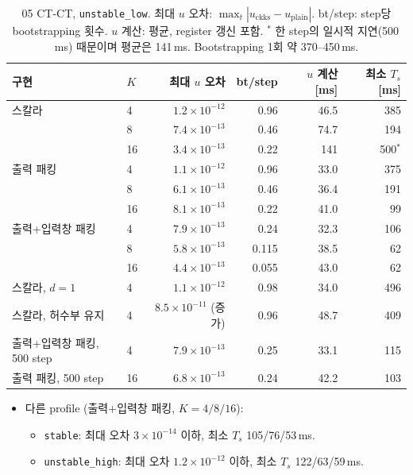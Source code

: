 \documentclass[11pt,a4paper]{article}
\begin{document}
\begin{table}[H]
\centering
\small
\begin{tabular}{llrrrr}
\toprule
구현 & $K$ & 최대 $u$ 오차 & bt/step & $u$ 계산 [ms] & 최소 $T_s$ [ms] \\
\midrule
스칼라 & 4 & $1.2\times10^{-12}$ & 0.96 & 46.5 & 385 \\
       & 8 & $7.4\times10^{-13}$ & 0.46 & 74.7 & 194 \\
       & 16 & $3.4\times10^{-13}$ & 0.22 & 141 & 500$^\ast$ \\
출력 패킹 & 4 & $1.1\times10^{-12}$ & 0.96 & 33.0 & 375 \\
          & 8 & $6.1\times10^{-13}$ & 0.46 & 36.4 & 191 \\
          & 16 & $8.1\times10^{-13}$ & 0.22 & 41.0 & 99 \\
출력+입력창 패킹 & 4 & $7.9\times10^{-13}$ & 0.24 & 32.3 & 106 \\
                 & 8 & $5.8\times10^{-13}$ & 0.115 & 38.5 & 62 \\
                 & 16 & $4.4\times10^{-13}$ & 0.055 & 43.0 & 62 \\
\midrule
스칼라, $d=1$ & 4 & $1.1\times10^{-12}$ & 0.98 & 34.0 & 496 \\
스칼라, 허수부 유지 & 4 & $8.5\times10^{-11}$ (증가) & 0.96 & 48.7 & 409 \\
출력+입력창 패킹, 500 step & 4 & $7.9\times10^{-13}$ & 0.25 & 33.1 & 115 \\
출력 패킹, 500 step & 16 & $6.8\times10^{-13}$ & 0.24 & 42.2 & 103 \\
\bottomrule
\end{tabular}
\caption{05 CT-CT, \texttt{unstable\_low}. 최대 $u$ 오차: $\max_t|u_{\mathrm{ckks}}-u_{\mathrm{plain}}|$. bt/step: step당 bootstrapping 횟수. $u$ 계산: 평균, register 갱신 포함. $^\ast$ 한 step의 일시적 지연(500\,ms) 때문이며 평균은 141\,ms. Bootstrapping 1회 약 370--450\,ms.}
\label{tab:05}
\end{table}

\begin{itemize}
\item 다른 profile (출력+입력창 패킹, $K=4/8/16$):
  \begin{itemize}
  \item \texttt{stable}: 최대 오차 $3\times10^{-14}$ 이하, 최소 $T_s$ 105/76/53\,ms.
  \item \texttt{unstable\_high}: 최대 오차 $1.2\times10^{-12}$ 이하, 최소 $T_s$ 122/63/59\,ms.
  \end{itemize}
\end{itemize}
\end{document}
